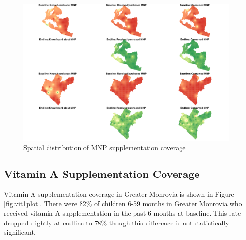 \documentclass[12pt,a4paper]{article}
\begin{document}
\begin{figure}[H]

{\centering \includegraphics{liberiaCoverageFinalReport_files/figure-latex/mnp1map-1} 

}

\caption{Spatial distribution of MNP supplementation coverage}\label{fig:mnp1map}
\end{figure}

\newpage

\hypertarget{vitamin-a-supplementation-coverage}{%
\subsection{Vitamin A Supplementation Coverage}\label{vitamin-a-supplementation-coverage}}

Vitamin A supplementation coverage in Greater Monrovia is shown in Figure \ref{fig:vit1plot}. There were 82\% of children 6-59 months in Greater Monrovia who received vitamin A supplementation in the past 6 months at baseline. This rate dropped slightly at endline to 78\% though this difference is not statistically significant.
\end{document}
